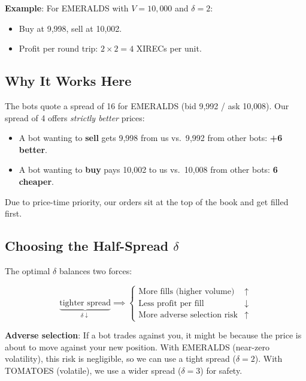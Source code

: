 \documentclass[11pt, letterpaper]{article}
\begin{document}
\textbf{Example}: For EMERALDS with $V = 10{,}000$ and $\delta = 2$:
\begin{itemize}
    \item Buy at 9{,}998, sell at 10{,}002.
    \item Profit per round trip: $2 \times 2 = 4$ XIRECs per unit.
\end{itemize}

\subsection{Why It Works Here}

The bots quote a spread of 16 for EMERALDS (bid 9{,}992 / ask 10{,}008). Our spread of 4 offers \emph{strictly better} prices:
\begin{itemize}
    \item A bot wanting to \textbf{sell} gets 9{,}998 from us vs.\ 9{,}992 from other bots: \textbf{+6 better}.
    \item A bot wanting to \textbf{buy} pays 10{,}002 to us vs.\ 10{,}008 from other bots: \textbf{6 cheaper}.
\end{itemize}

Due to price-time priority, our orders sit at the top of the book and get filled first.

\subsection{Choosing the Half-Spread $\delta$}

The optimal $\delta$ balances two forces:

\begin{equation}
    \underbrace{\text{tighter spread}}_{\delta \downarrow} \implies
    \begin{cases}
        \text{More fills (higher volume)} & \uparrow \\
        \text{Less profit per fill} & \downarrow \\
        \text{More adverse selection risk} & \uparrow
    \end{cases}
\end{equation}

\textbf{Adverse selection}: If a bot trades against you, it might be because the price is about to move against your new position. With EMERALDS (near-zero volatility), this risk is negligible, so we can use a tight spread ($\delta = 2$). With TOMATOES (volatile), we use a wider spread ($\delta = 3$) for safety.
\end{document}
